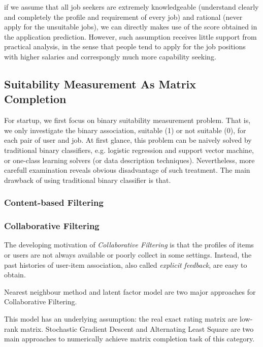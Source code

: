 \documentclass{article} %
\begin{document}
if we assume that all job seekers are extremely knowledgeable (understand
clearly and completely the profile and requirement of every job) and rational
(never apply for the unsuitable jobs), we can directly makes use of the score
obtained in the application prediction. However, such assumption receives
little support from practical analysis, in the sense that people tend to apply
for the job positions with higher salaries and correspongly much more
capability seeking.

\subsection{Suitability Measurement As Matrix Completion}
For startup, we first focus on binary suitability measurement problem. That
is, we only investigate the binary association, suitable (1) or not suitable
(0), for each pair of user and job. 
At first glance, this problem can be naively solved by traditional binary
classifiers, e.g. logistic regression and support vector machine, or one-class
learning solvers (or data description techniques).
Nevertheless, more carefull examination reveals obvious disadvantage of such
treatment. The main drawback of using traditional binary classifier is that.

\subsubsection{Content-based Filtering}

\subsubsection{Collaborative Filtering}
The developing motivation of {\it Collaborative Filtering} is that the
profiles of items or users are not always available or poorly collect in
some settings. Instead, the past histories of user-item association, also called {\it
    explicit feedback}, are easy to obtain.  

Nearest neighbour method and latent factor model are two major approaches for
Collaborative Filtering.


This model has an underlying assumption: the real exact rating matrix are
low-rank matrix.   
Stochastic Gradient Descent and Alternating Least Square are two main
approaches to numerically achieve matrix completion task of this category.
\end{document}
